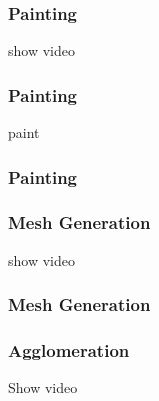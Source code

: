 \documentclass[aspectratio=169]{beamer}
\begin{document}
\begin{frame}
    \frametitle{Painting}
    show video
\end{frame}

    \def\colorOne{red}
    \def\colorTwo{blue}
    \def\colorThree{yellow}
    \def\colorFour{green}
    \def\colorFive{magenta}
    \def\cellSize{1.4em}
\begin{frame}
    \frametitle{Painting}
    {paint}
\end{frame}

\begin{frame}
    \frametitle{Painting}
\end{frame}

\begin{frame}
    \frametitle{Mesh Generation}
    show video
\end{frame}

\begin{frame}
    \frametitle{Mesh Generation}
    \centering
\end{frame}

\begin{frame}
    \frametitle{Agglomeration}
    Show video
\end{frame}
\end{document}
